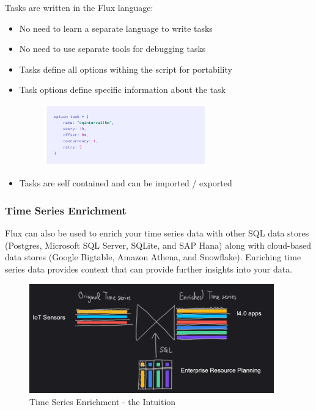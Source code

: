 \documentclass[10pt,a4paper]{article}
\begin{document}
 Tasks are written in the Flux language:
 \begin{itemize}
 	\item No need to learn a separate language to write tasks
 	\item No need to use separate tools for debugging tasks
 	\item Tasks define all options withing the script for portability
 	\item Task options define specific information about the task
 	  \begin{figure}[ht!]
 \hfill \includegraphics[width=200pt]{images/flux-tasks-opt}
 \hspace*{\fill}
 \end{figure} 
 \item Tasks are self contained and can be imported / exported
 \end{itemize}
 
 \subsubsection{Time Series Enrichment}
 Flux can also be used to enrich your time series data with other SQL data stores (Postgres, Microsoft SQL Server, SQLite, and SAP Hana) along with cloud-based data stores (Google Bigtable, Amazon Athena, and Snowflake). Enriching time series data provides context that can provide further insights into your data.
 
   \begin{figure}[ht!]
 \hfill \includegraphics[width=300pt]{images/flux-time-series-enrich}
 \hspace*{\fill}
 \caption{Time Series Enrichment - the Intuition}
 \end{figure} 
 
\end{document}
